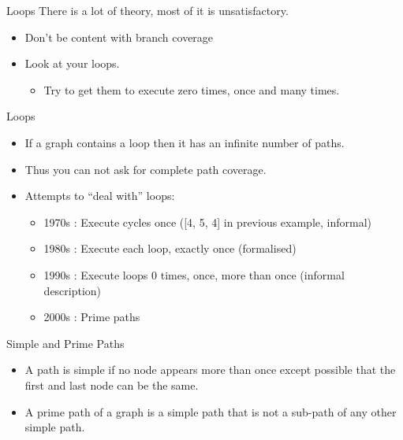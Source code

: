 \documentclass[handout]{beamer}
\begin{document}
\begin{frame}{Loops}
There is a lot of theory, most of it is unsatisfactory. 
  \begin{itemize}
  \item Don't be content with branch coverage
  \item Look at your loops.
    \begin{itemize}
    \item Try to get them to execute zero times, once and many times.
    \end{itemize}
  \end{itemize}
\end{frame}
  \begin{frame}{Loops}
    \begin{itemize}
      
  \item If a graph contains a loop then it has an infinite number of
    paths.
  \item Thus you can not ask for complete path coverage. 
  \item Attempts to “deal with” loops:
    \begin{itemize}
    \item 1970s : Execute cycles once  ([4, 5, 4] in previous example, informal)
    \item 1980s : Execute each loop, exactly once (formalised)
    \item 1990s : Execute loops 0 times, once, more than once (informal description)
    \item 2000s : Prime paths
\end{itemize}
  \end{itemize}
  
\end{frame}
\begin{frame}{Simple and Prime Paths}
  \begin{itemize}
  \item A path is simple if no node appears more than once except
    possible that the first and last node can be the same.
  \item A prime path of a graph is a simple path that is not a
    sub-path of any other simple path.
  \end{itemize}
  
\end{frame}
\end{document}
